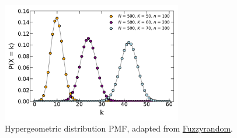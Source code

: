 \begin{figure}
\centering
\includegraphics[width=0.7\textwidth]{figures/stats/dist/hypergeometric_pmf}
\caption{
Hypergeometric distribution PMF,
adapted from \href{https://commons.wikimedia.org/wiki/File:HypergeometricPDF.png}{Fuzzyrandom}.
}
\label{fig:dist:hypergeometric}
\end{figure}
